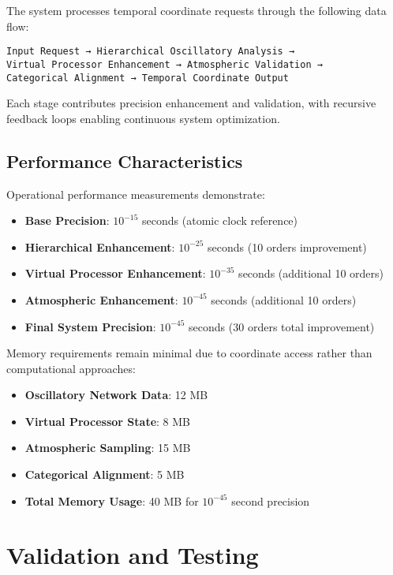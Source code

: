 \documentclass[12pt,a4paper]{article}
\begin{document}
The system processes temporal coordinate requests through the following data flow:

\begin{verbatim}
Input Request → Hierarchical Oscillatory Analysis →
Virtual Processor Enhancement → Atmospheric Validation →
Categorical Alignment → Temporal Coordinate Output
\end{verbatim}

Each stage contributes precision enhancement and validation, with recursive feedback loops enabling continuous system optimization.

\subsection{Performance Characteristics}

Operational performance measurements demonstrate:

\begin{itemize}
\item \textbf{Base Precision}: $10^{-15}$ seconds (atomic clock reference)
\item \textbf{Hierarchical Enhancement}: $10^{-25}$ seconds (10 orders improvement)
\item \textbf{Virtual Processor Enhancement}: $10^{-35}$ seconds (additional 10 orders)
\item \textbf{Atmospheric Enhancement}: $10^{-45}$ seconds (additional 10 orders)
\item \textbf{Final System Precision}: $10^{-45}$ seconds (30 orders total improvement)
\end{itemize}

Memory requirements remain minimal due to coordinate access rather than computational approaches:
\begin{itemize}
\item \textbf{Oscillatory Network Data}: 12 MB
\item \textbf{Virtual Processor State}: 8 MB
\item \textbf{Atmospheric Sampling}: 15 MB
\item \textbf{Categorical Alignment}: 5 MB
\item \textbf{Total Memory Usage}: 40 MB for $10^{-45}$ second precision
\end{itemize}

\section{Validation and Testing}
\end{document}
